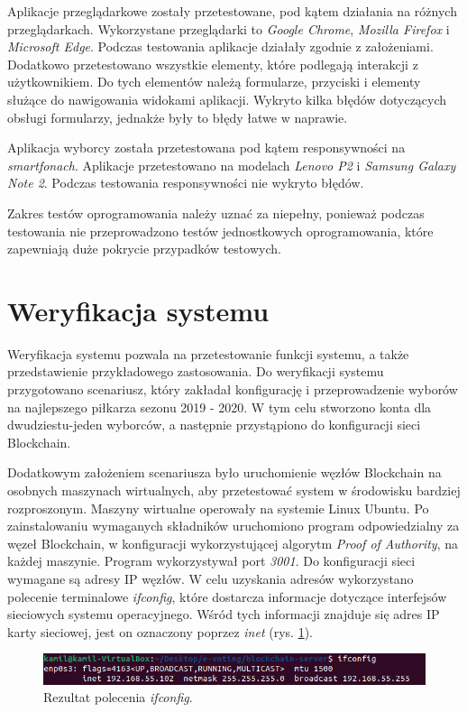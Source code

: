 \documentclass[a4paper,12pt]{book}
\begin{document}
Aplikacje przeglądarkowe zostały przetestowane, pod kątem działania na różnych przeglądarkach. Wykorzystane przeglądarki to \textit{Google Chrome}, \textit{Mozilla Firefox} i \textit{Microsoft Edge}. Podczas testowania aplikacje działały zgodnie z założeniami. Dodatkowo przetestowano wszystkie elementy, które podlegają interakcji z użytkownikiem. Do tych elementów należą formularze, przyciski i elementy służące do nawigowania widokami aplikacji. Wykryto kilka błędów dotyczących obsługi formularzy, jednakże były to błędy łatwe w naprawie.

Aplikacja wyborcy została przetestowana pod kątem responsywności na \textit{smartfonach}. Aplikacje przetestowano na modelach \textit{Lenovo P2} i \textit{Samsung Galaxy Note 2}. Podczas testowania responsywności nie wykryto błędów.
 
Zakres testów oprogramowania należy uznać za niepełny, ponieważ podczas testowania nie przeprowadzono testów jednostkowych oprogramowania, które zapewniają duże pokrycie przypadków testowych.

\section{Weryfikacja systemu}

Weryfikacja systemu pozwala na przetestowanie funkcji systemu, a także przedstawienie przykładowego zastosowania.
Do weryfikacji systemu przygotowano scenariusz, który zakładał konfigurację i przeprowadzenie wyborów na najlepszego piłkarza sezonu 2019 - 2020.
W tym celu stworzono konta dla dwudziestu-jeden wyborców, a następnie przystąpiono do konfiguracji sieci Blockchain.
 
Dodatkowym założeniem scenariusza było uruchomienie węzłów Blockchain na osobnych maszynach wirtualnych, aby przetestować system w środowisku bardziej rozproszonym.
Maszyny wirtualne operowały na systemie Linux Ubuntu. Po zainstalowaniu wymaganych składników uruchomiono program odpowiedzialny za węzeł Blockchain, w konfiguracji wykorzystującej algorytm \textit{Proof of Authority}, na każdej maszynie.
Program wykorzystywał port \textit{3001}. Do konfiguracji sieci wymagane są adresy IP węzłów. W celu uzyskania adresów wykorzystano polecenie terminalowe \textit{ifconfig}, które dostarcza informacje dotyczące interfejsów sieciowych 
systemu operacyjnego. Wśród tych informacji znajduje się adres IP karty sieciowej, jest on oznaczony poprzez \textit{inet} (rys. \ref{ifconfig}). 
 
\begin{figure}[H]
  \centering
\includegraphics[width=\textwidth]{images/ifconfig.png}
\caption{Rezultat polecenia \textit{ifconfig}.}\label{ifconfig}
\end {figure}
\end{document}

